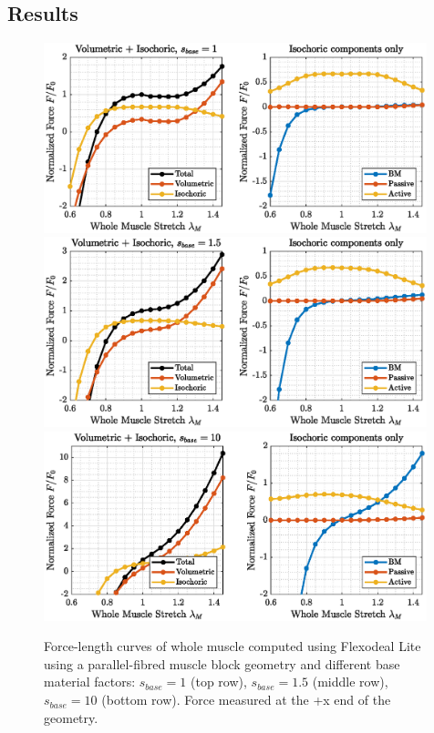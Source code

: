 \documentclass{sfuthesis}
\numberwithin{equation}{section}
\numberwithin{figure}{chapter}
\numberwithin{table}{chapter}
\theoremstyle{definition}
\begin{document}
\subsection{Results}

\begin{figure}
    \centering
    \includegraphics[width=0.99\textwidth]{fl_curve_flexodeal_lite_bm_1.eps}\\[1em]
    \includegraphics[width=0.99\textwidth]{fl_curve_flexodeal_lite_bm_1.5.eps}\\[1em]
    \includegraphics[width=0.99\textwidth]{fl_curve_flexodeal_lite_bm_10.eps}
    \caption{Force-length curves of whole muscle computed using Flexodeal Lite using a parallel-fibred muscle block geometry and different base material factors: $s_{base}=1$ (top row), $s_{base}=1.5$ (middle row), $s_{base}=10$ (bottom row). Force measured at the +x end of the geometry.\label{fig:fl-curves-block}}
\end{figure}
\end{document}
